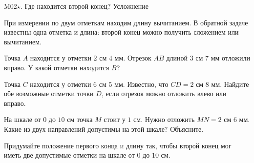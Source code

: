 \worksheettitle
  {M02\(\star\). Где находится второй конец?}
  { Усложнение}

\studentnameblock

\begin{notebox}[Идея]
  При измерении по двум отметкам находим длину вычитанием. В обратной задаче
  известны одна отметка и длина: второй конец можно получить сложением или
  вычитанием.
\end{notebox}

\begin{practicebox}
  Точка $A$ находится у отметки $2\text{ см }4\text{ мм}$. Отрезок
  $AB$ длиной $3\text{ см }7\text{ мм}$ отложили вправо.
  У какой отметки находится $B$? 
\end{practicebox}

\begin{practicebox}
  Точка $C$ находится у отметки $6\text{ см }5\text{ мм}$. Известно, что
  $CD=2\text{ см }8\text{ мм}$. Найдите обе возможные отметки точки $D$,
  если отрезок можно отложить влево или вправо.
\end{practicebox}

\begin{practicebox}
  На шкале от $0$ до $10\text{ см}$ точка $M$ стоит у $1\text{ см}$.
  Нужно отложить $MN=2\text{ см }6\text{ мм}$. Какие из двух направлений
  допустимы на этой шкале? Объясните. 
\end{practicebox}

\begin{checkpointbox}
  Придумайте положение первого конца и длину так, чтобы второй конец мог иметь
  две допустимые отметки на шкале от $0$ до $10\text{ см}$.
\end{checkpointbox}
